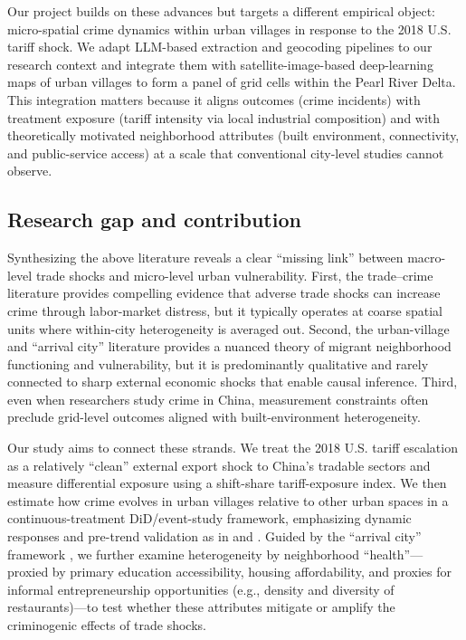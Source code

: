 Our project builds on these advances but targets a different empirical object: micro-spatial crime dynamics within urban villages in response to the 2018 U.S. tariff shock. We adapt LLM-based extraction and geocoding pipelines to our research context and integrate them with satellite-image-based deep-learning maps of urban villages to form a panel of grid cells within the Pearl River Delta. This integration matters because it aligns outcomes (crime incidents) with treatment exposure (tariff intensity via local industrial composition) and with theoretically motivated neighborhood attributes (built environment, connectivity, and public-service access) at a scale that conventional city-level studies cannot observe.

\subsection{Research gap and contribution}
\label{subsec:gap_contrib}

Synthesizing the above literature reveals a clear ``missing link'' between macro-level trade shocks and micro-level urban vulnerability. First, the trade--crime literature provides compelling evidence that adverse trade shocks can increase crime through labor-market distress, but it typically operates at coarse spatial units where within-city heterogeneity is averaged out. Second, the urban-village and ``arrival city'' literature provides a nuanced theory of migrant neighborhood functioning and vulnerability, but it is predominantly qualitative and rarely connected to sharp external economic shocks that enable causal inference. Third, even when researchers study crime in China, measurement constraints often preclude grid-level outcomes aligned with built-environment heterogeneity.

Our study aims to connect these strands. We treat the 2018 U.S. tariff escalation as a relatively ``clean'' external export shock to China's tradable sectors and measure differential exposure using a shift-share tariff-exposure index. We then estimate how crime evolves in urban villages relative to other urban spaces in a continuous-treatment DiD/event-study framework, emphasizing dynamic responses and pre-trend validation as in \citet{dixcarneirosoaresulyssea2018economic} and \citet{ma2025export}. Guided by the ``arrival city'' framework \citep{saunders2010arrival}, we further examine heterogeneity by neighborhood ``health''---proxied by primary education accessibility, housing affordability, and proxies for informal entrepreneurship opportunities (e.g., density and diversity of restaurants)—to test whether these attributes mitigate or amplify the criminogenic effects of trade shocks.

